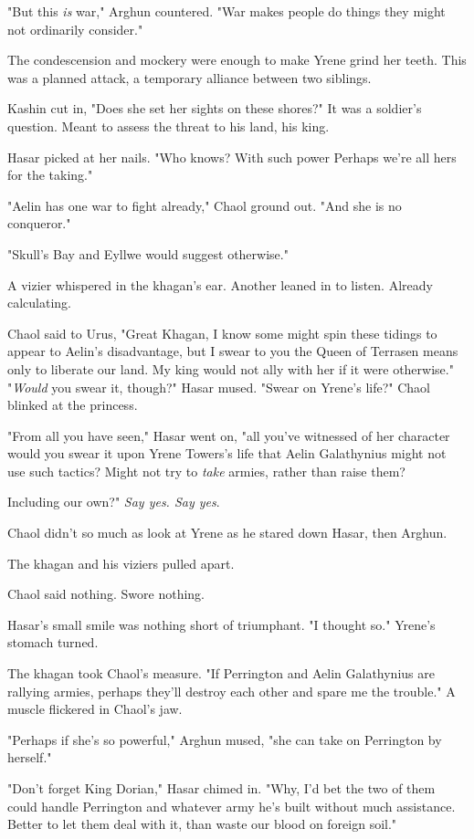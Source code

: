 "But this \emph{is} war," Arghun countered. "War makes people do things they might not ordinarily consider."

The condescension and mockery were enough to make Yrene grind her teeth. This was a planned attack, a temporary alliance between two siblings.

Kashin cut in, "Does she set her sights on these shores?" It was a soldier's question. Meant to assess the threat to his land, his king.

Hasar picked at her nails. "Who knows? With such power  Perhaps we're all hers for the taking."

"Aelin has one war to fight already," Chaol ground out. "And she is no conqueror."

"Skull's Bay and Eyllwe would suggest otherwise."

A vizier whispered in the khagan's ear. Another leaned in to listen. Already calculating.

Chaol said to Urus, "Great Khagan, I know some might spin these tidings to appear to Aelin's disadvantage, but I swear to you the Queen of Terrasen means only to liberate our land. My king would not ally with her if it were otherwise." "\emph{Would} you swear it, though?" Hasar mused. "Swear on Yrene's life?" Chaol blinked at the princess.

"From all you have seen," Hasar went on, "all you've witnessed of her character  would you swear it upon Yrene Towers's life that Aelin Galathynius might not use such tactics? Might not try to
\emph{take} armies, rather than raise them?

Including our own?" \emph{Say yes. Say yes}.

Chaol didn't so much as look at Yrene as he stared down Hasar, then Arghun.

The khagan and his viziers pulled apart.

Chaol said nothing. Swore nothing.

Hasar's small smile was nothing short of triumphant. "I thought so." Yrene's stomach turned.

The khagan took Chaol's measure. "If Perrington and Aelin Galathynius are rallying armies, perhaps they'll destroy each other and spare me the trouble." A muscle flickered in Chaol's jaw.

"Perhaps if she's so powerful," Arghun mused, "she can take on Perrington by herself."

"Don't forget King Dorian," Hasar chimed in. "Why, I'd bet the two of them could handle Perrington and whatever army he's built without much assistance. Better to let them deal with it, than waste our blood on foreign soil."

